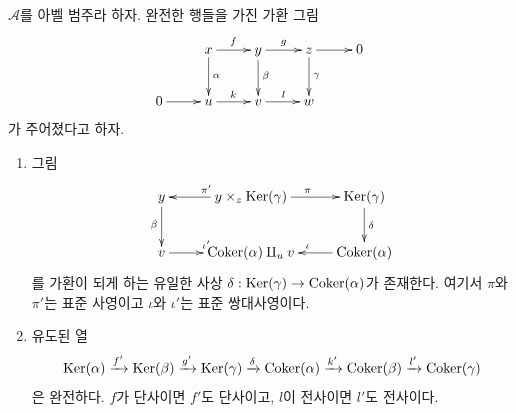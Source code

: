\begin{lemma}
\label{lemma-snake}
$\mathcal{A}$를 아벨 범주라 하자. 완전한 행들을 가진 가환 그림
$$
\xymatrix{
& x \ar[r]^f \ar[d]^\alpha &
y \ar[r]^g \ar[d]^\beta &
z \ar[r] \ar[d]^\gamma &
0 \\
0 \ar[r] & u \ar[r]^k & v \ar[r]^l & w
}
$$
가 주어졌다고 하자.
\begin{enumerate}
\item 그림
$$
\xymatrix{
y \ar[d]_\beta &
y \times_z \Ker(\gamma) \ar[l]_{\pi'} \ar[r]^{\pi} &
\Ker(\gamma) \ar[d]^\delta \\
v \ar[r]^{\iota'} & \Coker(\alpha) \amalg_u v &
\Coker(\alpha) \ar[l]_\iota
}
$$
를 가환이 되게 하는 유일한 사상
$\delta : \mathop{\mathrm{Ker}}(\gamma) \to \mathop{\mathrm{Coker}}(\alpha)$가 존재한다. 여기서
$\pi$와 $\pi'$는 표준 사영이고 $\iota$와 $\iota'$는 표준 쌍대사영이다.
\item 유도된 열
$$
\mathop{\mathrm{Ker}}(\alpha) \xrightarrow{f'} \mathop{\mathrm{Ker}}(\beta) \xrightarrow{g'}
\mathop{\mathrm{Ker}}(\gamma) \xrightarrow{\delta} \mathop{\mathrm{Coker}}(\alpha) \xrightarrow{k'}
\mathop{\mathrm{Coker}}(\beta) \xrightarrow{l'} \mathop{\mathrm{Coker}}(\gamma)
$$
은 완전하다. $f$가 단사이면 $f'$도 단사이고, $l$이 전사이면
$l'$도 전사이다.
\end{enumerate}
\end{lemma}

